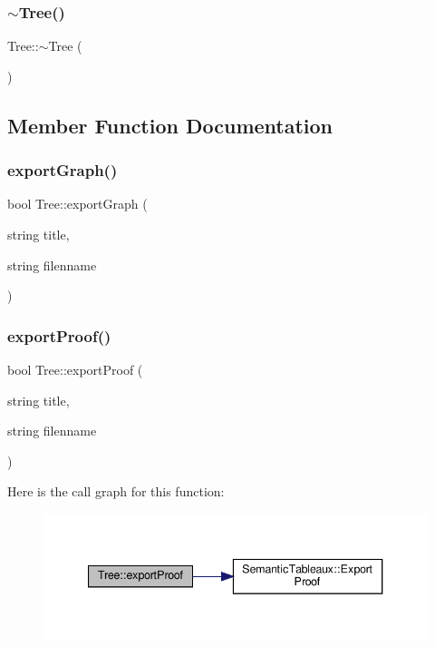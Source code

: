 \subsubsection{\texorpdfstring{$\sim$\+Tree()}{~Tree()}}
{\footnotesize\ttfamily Tree\+::$\sim$\+Tree (\begin{DoxyParamCaption}{ }\end{DoxyParamCaption})\hspace{0.3cm}{\ttfamily [virtual]}}



\subsection{Member Function Documentation}
\mbox{\label{class_tree_ae19f22cfa4b782b5c0a048592ea3e95f}} 
\subsubsection{\texorpdfstring{export\+Graph()}{exportGraph()}}
{\footnotesize\ttfamily bool Tree\+::export\+Graph (\begin{DoxyParamCaption}\item[{string}]{title,  }\item[{string}]{filenname }\end{DoxyParamCaption})}

\mbox{\label{class_tree_ae235cdb84985c90fa56697a28b0a8d9e}} 
\subsubsection{\texorpdfstring{export\+Proof()}{exportProof()}}
{\footnotesize\ttfamily bool Tree\+::export\+Proof (\begin{DoxyParamCaption}\item[{string}]{title,  }\item[{string}]{filenname }\end{DoxyParamCaption})}

Here is the call graph for this function\+:\nopagebreak
\begin{figure}[H]
\begin{center}
\leavevmode
\includegraphics[width=340pt]{dd/df8/class_tree_ae235cdb84985c90fa56697a28b0a8d9e_cgraph}
\end{center}
\end{figure}
\mbox{\label{class_tree_a9d7b51cc207222de02ccb59192454de5}} 
